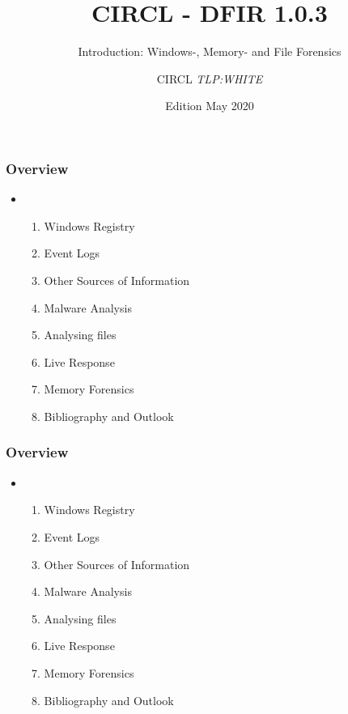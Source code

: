\documentclass{beamer}
\author{CIRCL \emph{TLP:WHITE}}
\title{CIRCL - DFIR 1.0.3}
\subtitle{Introduction: Windows-, Memory- and File Forensics}
\institute{info@circl.lu}
\date{Edition May 2020}
\begin{document}
\begin{frame}[t,plain]
\titlepage
\end{frame}

\begin{frame}
  \frametitle{Overview}
  \begin{itemize}
  \item[]
      \begin{enumerate}
          \item Windows Registry
          \item Event Logs
          \item Other Sources of Information
          \item Malware Analysis
          \item Analysing files
          \item Live Response
          \item Memory Forensics
          \item Bibliography and Outlook
      \end{enumerate}

  \end{itemize}
\end{frame}












\begin{frame}
  \frametitle{Overview}
  \begin{itemize}
  \item[]
      \begin{enumerate}
          \item Windows Registry
          \item Event Logs
          \item Other Sources of Information
          \item Malware Analysis
          \item Analysing files
          \item Live Response
          \item Memory Forensics
          \item Bibliography and Outlook
      \end{enumerate}

  \end{itemize}
\end{frame}
\end{document}

